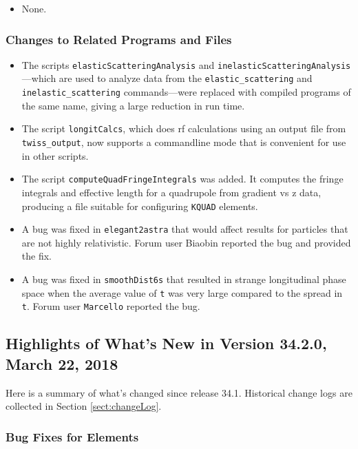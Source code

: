 \documentclass[11pt]{article}
\begin{document}
\begin{itemize}
\item None.
\end{itemize}

\subsubsection{Changes to Related Programs and Files}

\begin{itemize}
\item The scripts \verb|elasticScatteringAnalysis| and \verb|inelasticScatteringAnalysis|---which are used to
  analyze data from the \verb|elastic_scattering| and \verb|inelastic_scattering| commands---were replaced with
  compiled programs of the same name, giving a large reduction in run time.
\item The script \verb|longitCalcs|, which does rf calculations using an output file from \verb|twiss_output|, 
  now supports a commandline mode that is convenient for use in other scripts.
\item The script \verb|computeQuadFringeIntegrals| was added. It computes the fringe integrals and effective
  length for a quadrupole from gradient vs z data, producing a file suitable for configuring \verb|KQUAD| elements.
\item A bug was fixed in \verb|elegant2astra| that would affect results for particles that are not
   highly relativistic. Forum user Biaobin reported the bug and provided the fix.
\item A bug was fixed in \verb|smoothDist6s| that resulted in strange longitudinal phase space when the 
  average value of \verb|t| was very large compared to the spread in \verb|t|. Forum user \verb|Marcello| reported
  the bug.
\end{itemize}

\subsection{Highlights of What's New in Version 34.2.0, March 22, 2018}

Here is a summary of what's changed since release 34.1.
Historical change logs are collected in Section \ref{sect:changeLog}.

\subsubsection{Bug Fixes for Elements}
\end{document}
